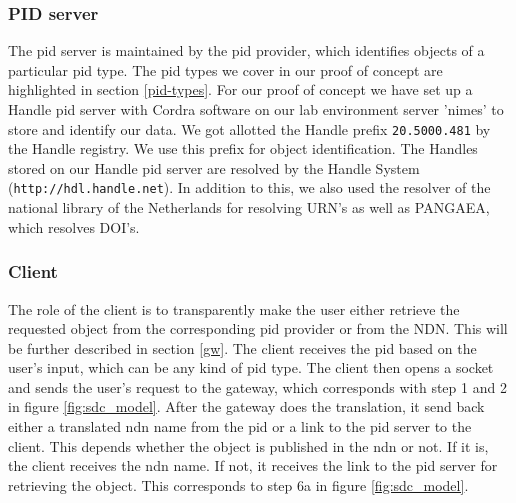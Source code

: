 \subsubsection{PID server}
The \gls{pid} server is maintained by the \gls{pid} provider, which identifies objects of a particular \gls{pid} type. The \gls{pid} types we cover in our proof of concept are highlighted in section \ref{pid-types}. For our proof of concept we have set up a Handle \gls{pid} server with Cordra software \cite{cor} on our lab environment server 'nimes' to store and identify our data. We got allotted the Handle prefix \texttt{20.5000.481} by the Handle registry. We use this prefix for object identification. The Handles stored on our Handle \gls{pid} server are resolved by the Handle System (\texttt{http://hdl.handle.net}). In addition to this, we also used the resolver of the national library of the Netherlands for resolving URN's as well as PANGAEA, which resolves DOI's. 

\subsubsection{Client}\label{client}
The role of the client is to transparently make the user either retrieve the requested object from the corresponding \gls{pid} provider or from the NDN. This will be further described in section \ref{gw}. The client receives the \gls{pid} based on the user's input, which can be any kind of \gls{pid} type. The client then opens a socket and sends the user's request to the gateway, which corresponds with step 1 and 2 in figure \ref{fig:sdc_model}. After the gateway does the translation, it send back either a translated \gls{ndn} name from the \gls{pid} or a link to the \gls{pid} server to the client. This depends whether the object is published in the \gls{ndn} or not. If it is, the client receives the \gls{ndn} name. If not, it receives the link to the \gls{pid} server for retrieving the object. This corresponds to step 6a in figure \ref{fig:sdc_model}.


